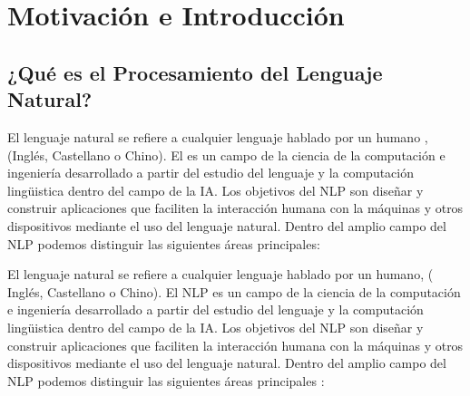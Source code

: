 \chapter{Motivación e Introducción}\label{ch:introduction}






\section{¿Qué es el Procesamiento del Lenguaje Natural?}
\label{sec:whatisnlp}

El lenguaje natural se refiere a cualquier lenguaje hablado por un
humano \cite{James2012}, (\eg Inglés, Castellano o
Chino). El  es un campo de la ciencia
de la computación e ingeniería desarrollado a partir del estudio del lenguaje y
la computación lingüistica dentro del campo de la \ac{IA}. Los objetivos del
\ac{NLP} son diseñar y construir aplicaciones que faciliten la interacción
humana con la máquinas y otros dispositivos mediante el uso del lenguaje
natural. Dentro del amplio campo del \ac{NLP} podemos distinguir las siguientes
áreas principales:

El lenguaje natural se refiere a cualquier lenguaje hablado por un humano, (\eg
Inglés, Castellano o Chino). El \ac{NLP} es un campo de la
ciencia de la computación e ingeniería desarrollado a partir del estudio del
lenguaje y la computación lingüistica dentro del campo de la \ac{IA}. Los
objetivos del \ac{NLP} son diseñar y construir aplicaciones que faciliten la
interacción humana con la máquinas y otros dispositivos mediante el uso del
lenguaje natural. Dentro del amplio campo del \ac{NLP} podemos distinguir las
siguientes áreas principales \cite{Hirschberg2015, James2012}:

